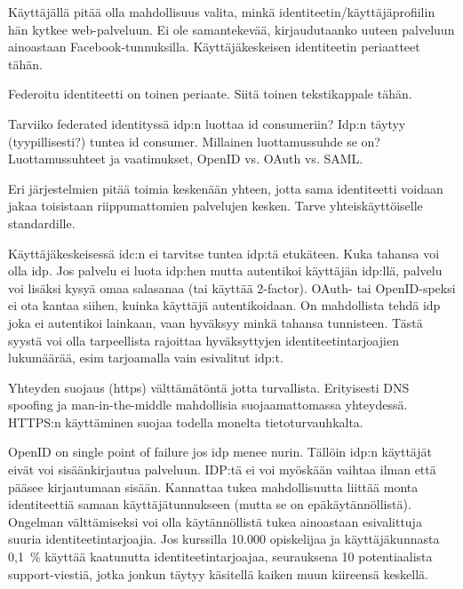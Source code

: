 \documentclass[finnish,gradu]{tktltiki}
\begin{document}
  Käyttäjällä pitää olla mahdollisuus valita, minkä identiteetin/käyttäjäprofiilin hän kytkee web-palveluun. Ei ole samantekevää, kirjaudutaanko uuteen palveluun ainoastaan Facebook-tunnuksilla. Käyttäjäkeskeisen identiteetin periaatteet tähän. %



  Federoitu identiteetti on toinen periaate. Siitä toinen tekstikappale tähän. %

  Tarviiko federated identityssä idp:n luottaa id consumeriin? Idp:n täytyy (tyypillisesti?) tuntea id consumer. Millainen luottamussuhde se on?
  Luottamussuhteet ja vaatimukset, OpenID vs. OAuth vs. SAML.

  Eri järjestelmien pitää toimia keskenään yhteen, jotta sama identiteetti voidaan jakaa toisistaan riippumattomien palvelujen kesken. Tarve yhteiskäyttöiselle standardille.

  Käyttäjäkeskeisessä idc:n ei tarvitse tuntea idp:tä etukäteen. Kuka tahansa voi olla idp.
  Jos palvelu ei luota idp:hen mutta autentikoi käyttäjän idp:llä, palvelu voi lisäksi kysyä omaa salasanaa (tai käyttää 2-factor).
  OAuth- tai OpenID-speksi ei ota kantaa siihen, kuinka käyttäjä autentikoidaan. On mahdollista tehdä idp joka ei autentikoi lainkaan, vaan hyväksyy minkä tahansa tunnisteen. Tästä syystä voi olla tarpeellista rajoittaa hyväksyttyjen identiteetintarjoajien lukumäärää, esim tarjoamalla vain esivalitut idp:t.

  Yhteyden suojaus (https) välttämätöntä jotta turvallista. Erityisesti DNS spoofing ja man-in-the-middle mahdollisia suojaamattomassa yhteydessä.
  HTTPS:n käyttäminen suojaa todella monelta tietoturvauhkalta.

  OpenID on single point of failure jos idp menee nurin. Tällöin idp:n käyttäjät eivät voi sisäänkirjautua palveluun. IDP:tä ei voi myöskään vaihtaa ilman että pääsee kirjautumaan sisään. Kannattaa tukea mahdollisuutta liittää monta identiteettiä samaan käyttäjätunnukseen (mutta se on epäkäytännöllistä). Ongelman välttämiseksi voi olla käytännöllistä tukea ainoastaan esivalittuja suuria identiteetintarjoajia. Jos kurssilla 10.000 opiskelijaa ja käyttäjäkunnasta 0,1~\% käyttää kaatunutta identiteetintarjoajaa, seurauksena 10 potentiaalista support-viestiä, jotka jonkun täytyy käsitellä kaiken muun kiireensä keskellä.
\end{document}
